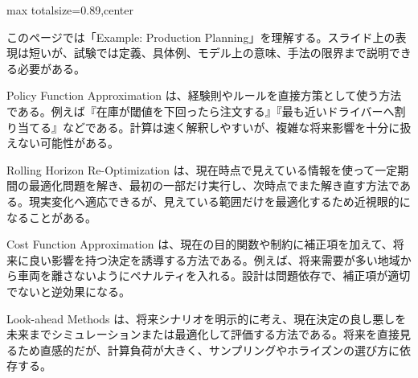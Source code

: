 \begin{minipage}[t]{0.58\textwidth}
\begin{adjustbox}{max totalsize={\textwidth}{0.89\textheight},center}
\begin{minipage}{\textwidth}\scriptsize
{}このページでは「Example: Production Planning」を理解する。スライド上の表現は短いが、試験では定義、具体例、モデル上の意味、手法の限界まで説明できる必要がある。\par
Policy Function Approximation は、経験則やルールを直接方策として使う方法である。例えば『在庫が閾値を下回ったら注文する』『最も近いドライバーへ割り当てる』などである。計算は速く解釈しやすいが、複雑な将来影響を十分に扱えない可能性がある。\par
Rolling Horizon Re-Optimization は、現在時点で見えている情報を使って一定期間の最適化問題を解き、最初の一部だけ実行し、次時点でまた解き直す方法である。現実変化へ適応できるが、見えている範囲だけを最適化するため近視眼的になることがある。\par
Cost Function Approximation は、現在の目的関数や制約に補正項を加えて、将来に良い影響を持つ決定を誘導する方法である。例えば、将来需要が多い地域から車両を離さないようにペナルティを入れる。設計は問題依存で、補正項が適切でないと逆効果になる。\par
Look-ahead Methods は、将来シナリオを明示的に考え、現在決定の良し悪しを未来までシミュレーションまたは最適化して評価する方法である。将来を直接見るため直感的だが、計算負荷が大きく、サンプリングやホライズンの選び方に依存する。\par

\end{minipage}
\end{adjustbox}
\end{minipage}
